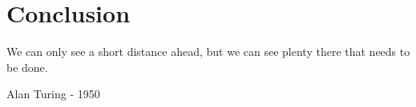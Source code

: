 \chapter{Conclusion}
\label{conclusion}
\epigraph{We can only see a short distance ahead, but we can see plenty there that needs to be done.}{Alan Turing - 1950}